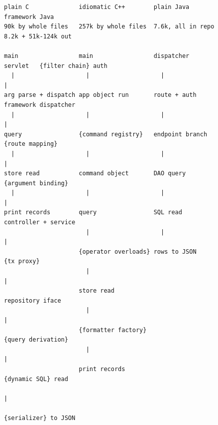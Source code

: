 \documentclass[journal]{IEEEtran}
\begin{document}
\begin{figure}[!t]
\footnotesize
\begin{verbatim}
plain C              idiomatic C++        plain Java           framework Java
90k by whole files   257k by whole files  7.6k, all in repo    8.2k + 51k-124k out

main                 main                 dispatcher servlet   {filter chain} auth
  |                    |                    |                    |
arg parse + dispatch app object run       route + auth         framework dispatcher
  |                    |                    |                    |
query                {command registry}   endpoint branch      {route mapping}
  |                    |                    |                    |
store read           command object       DAO query            {argument binding}
  |                    |                    |                    |
print records        query                SQL read             controller + service
                       |                    |                    |
                     {operator overloads} rows to JSON         {tx proxy}
                       |                                         |
                     store read                                repository iface
                       |                                         |
                     {formatter factory}                       {query derivation}
                       |                                         |
                     print records                             {dynamic SQL} read
                                                                 |
                                                               {serializer} to JSON


\end{verbatim}
\end{figure}
\end{document}
